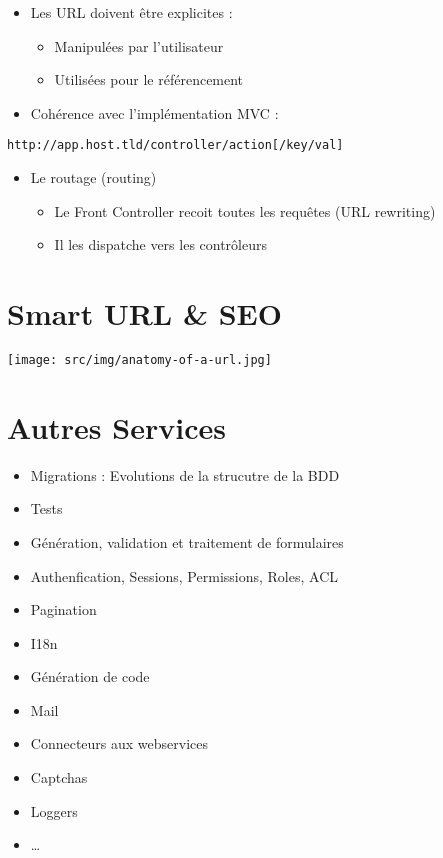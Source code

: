 \begin{itemize}
\tightlist
\item
  Les URL doivent être explicites :

  \begin{itemize}
  \tightlist
  \item
    Manipulées par l'utilisateur
  \item
    Utilisées pour le référencement
  \end{itemize}
\item
  Cohérence avec l'implémentation MVC :
\end{itemize}

\begin{otherlanguage}{english}

\begin{verbatim}
http://app.host.tld/controller/action[/key/val]
\end{verbatim}

\end{otherlanguage}

\begin{itemize}
\tightlist
\item
  Le routage (routing)

  \begin{itemize}
  \tightlist
  \item
    Le Front Controller recoit toutes les requêtes (URL rewriting)
  \item
    Il les dispatche vers les contrôleurs
  \end{itemize}
\end{itemize}

\hypertarget{smart-url-seo}{%
\section{Smart URL \& SEO}\label{smart-url-seo}}

\texttt{[image: src/img/anatomy-of-a-url.jpg]}

\hypertarget{autres-services}{%
\section{Autres Services}\label{autres-services}}

\begin{itemize}
\tightlist
\item
  Migrations : Evolutions de la strucutre de la BDD
\item
  Tests
\item
  Génération, validation et traitement de formulaires
\item
  Authenfication, Sessions, Permissions, Roles, ACL
\item
  Pagination
\item
  I18n
\item
  Génération de code
\item
  Mail
\item
  Connecteurs aux webservices
\item
  Captchas
\item
  Loggers
\item
  \ldots{}
\end{itemize}

